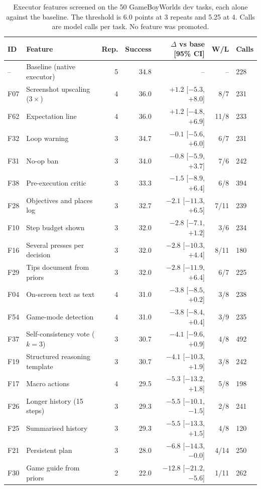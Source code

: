 \begin{table}[t]
\centering
\small
\caption{Executor features screened on the 50 GameBoyWorlds dev tasks, each alone against the baseline. The
threshold is 6.0 points at 3 repeats and 5.25 at 4. Calls are model calls per task. No feature was promoted.}
\label{tab:gb-screening}
\begin{tabular}{llrrrrl}
\toprule
ID & Feature & Rep. & Success & $\Delta$ vs base [95\% CI] & W/L & Calls \\
\midrule
-- & Baseline (native executor) & 5 & 34.8 & -- & -- & 228 \\
\midrule
F07 & Screenshot upscaling ($3\times$) & 4 & 36.0 & $+1.2$ [$-5.3$, $+8.0$] & 8/7 & 231 \\
F62 & Expectation line & 4 & 36.0 & $+1.2$ [$-4.8$, $+6.9$] & 11/8 & 233 \\
F32 & Loop warning & 3 & 34.7 & $-0.1$ [$-5.6$, $+6.0$] & 6/7 & 231 \\
F31 & No-op ban & 3 & 34.0 & $-0.8$ [$-5.9$, $+3.7$] & 7/6 & 242 \\
F38 & Pre-execution critic & 3 & 33.3 & $-1.5$ [$-8.9$, $+6.4$] & 6/8 & 394 \\
F28 & Objectives and places log & 3 & 32.7 & $-2.1$ [$-11.3$, $+6.5$] & 7/11 & 239 \\
F10 & Step budget shown & 3 & 32.0 & $-2.8$ [$-7.1$, $+1.2$] & 3/6 & 234 \\
F16 & Several presses per decision & 3 & 32.0 & $-2.8$ [$-10.3$, $+4.4$] & 8/11 & 180 \\
F29 & Tips document from priors & 3 & 32.0 & $-2.8$ [$-11.9$, $+6.4$] & 6/7 & 225 \\
F04 & On-screen text as text & 4 & 31.0 & $-3.8$ [$-8.5$, $+0.2$] & 3/8 & 238 \\
F54 & Game-mode detection & 4 & 31.0 & $-3.8$ [$-8.4$, $+0.4$] & 3/9 & 235 \\
F37 & Self-consistency vote ($k{=}3$) & 3 & 30.7 & $-4.1$ [$-9.6$, $+0.9$] & 4/8 & 492 \\
F19 & Structured reasoning template & 3 & 30.7 & $-4.1$ [$-10.3$, $+1.9$] & 3/8 & 242 \\
F17 & Macro actions & 4 & 29.5 & $-5.3$ [$-13.2$, $+1.8$] & 5/8 & 198 \\
F26 & Longer history (15 steps) & 3 & 29.3 & $-5.5$ [$-10.1$, $-1.5$] & 2/8 & 241 \\
F25 & Summarised history & 3 & 29.3 & $-5.5$ [$-13.3$, $+1.5$] & 4/8 & 120 \\
F21 & Persistent plan & 3 & 28.0 & $-6.8$ [$-14.3$, $-0.0$] & 4/14 & 250 \\
F30 & Game guide from priors & 2 & 22.0 & $-12.8$ [$-21.2$, $-5.6$] & 1/11 & 262 \\
\bottomrule
\end{tabular}
\end{table}

